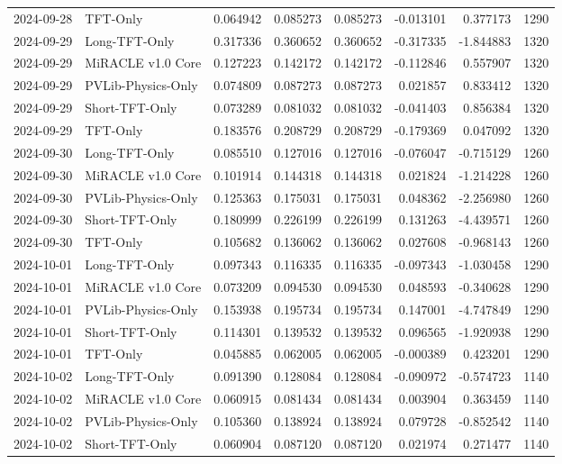 \begin{tabular}{llrrrrrr}
2024-09-28 & TFT-Only & 0.064942 & 0.085273 & 0.085273 & -0.013101 & 0.377173 & 1290 \\
2024-09-29 & Long-TFT-Only & 0.317336 & 0.360652 & 0.360652 & -0.317335 & -1.844883 & 1320 \\
2024-09-29 & MiRACLE v1.0 Core & 0.127223 & 0.142172 & 0.142172 & -0.112846 & 0.557907 & 1320 \\
2024-09-29 & PVLib-Physics-Only & 0.074809 & 0.087273 & 0.087273 & 0.021857 & 0.833412 & 1320 \\
2024-09-29 & Short-TFT-Only & 0.073289 & 0.081032 & 0.081032 & -0.041403 & 0.856384 & 1320 \\
2024-09-29 & TFT-Only & 0.183576 & 0.208729 & 0.208729 & -0.179369 & 0.047092 & 1320 \\
2024-09-30 & Long-TFT-Only & 0.085510 & 0.127016 & 0.127016 & -0.076047 & -0.715129 & 1260 \\
2024-09-30 & MiRACLE v1.0 Core & 0.101914 & 0.144318 & 0.144318 & 0.021824 & -1.214228 & 1260 \\
2024-09-30 & PVLib-Physics-Only & 0.125363 & 0.175031 & 0.175031 & 0.048362 & -2.256980 & 1260 \\
2024-09-30 & Short-TFT-Only & 0.180999 & 0.226199 & 0.226199 & 0.131263 & -4.439571 & 1260 \\
2024-09-30 & TFT-Only & 0.105682 & 0.136062 & 0.136062 & 0.027608 & -0.968143 & 1260 \\
2024-10-01 & Long-TFT-Only & 0.097343 & 0.116335 & 0.116335 & -0.097343 & -1.030458 & 1290 \\
2024-10-01 & MiRACLE v1.0 Core & 0.073209 & 0.094530 & 0.094530 & 0.048593 & -0.340628 & 1290 \\
2024-10-01 & PVLib-Physics-Only & 0.153938 & 0.195734 & 0.195734 & 0.147001 & -4.747849 & 1290 \\
2024-10-01 & Short-TFT-Only & 0.114301 & 0.139532 & 0.139532 & 0.096565 & -1.920938 & 1290 \\
2024-10-01 & TFT-Only & 0.045885 & 0.062005 & 0.062005 & -0.000389 & 0.423201 & 1290 \\
2024-10-02 & Long-TFT-Only & 0.091390 & 0.128084 & 0.128084 & -0.090972 & -0.574723 & 1140 \\
2024-10-02 & MiRACLE v1.0 Core & 0.060915 & 0.081434 & 0.081434 & 0.003904 & 0.363459 & 1140 \\
2024-10-02 & PVLib-Physics-Only & 0.105360 & 0.138924 & 0.138924 & 0.079728 & -0.852542 & 1140 \\
2024-10-02 & Short-TFT-Only & 0.060904 & 0.087120 & 0.087120 & 0.021974 & 0.271477 & 1140 \\

\end{tabular}

